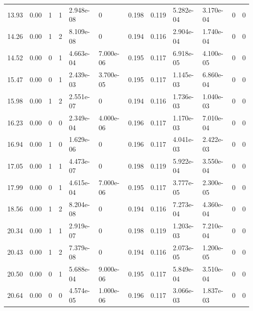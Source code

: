 \documentclass[preview]{standalone}
\begin{document}
{{\begin{tabular}{L{1.2cm}C{1.2cm} C{0.3cm}C{0.5cm} C{1.4cm}C{1.4cm} C{1.4cm}C{1.4cm} C{1.6cm}C{1.6cm} C{1.6cm}C{1.6cm}}
  13.93  &  0.00  & 1     &  1 &  2.948e-08  & 0  &  0.198&   0.119& 5.282e-04 & 3.170e-04   &  0 & 0  \\ 
  14.26  &  0.00  & 1     &  2 &  8.109e-08  & 0  &  0.194&   0.116& 2.904e-04 & 1.740e-04   &  0 & 0  \\ 
  14.52  &  0.00  & 0     &  1 &  4.663e-04  & 7.000e-06  &  0.195&   0.117& 6.918e-05 & 4.100e-05   &  0 & 0  \\ 
  15.47  &  0.00  & 0     &  1 &  2.439e-03  & 3.700e-05  &  0.195&   0.117& 1.145e-03 & 6.860e-04   &  0 & 0  \\ 
  15.98  &  0.00  & 1     &  2 &  2.551e-07  & 0  &  0.194&   0.116& 1.736e-03 & 1.040e-03   &  0 & 0  \\ 
  16.23  &  0.00  & 0     &  0 &  2.349e-04  & 4.000e-06  &  0.196&   0.117& 1.170e-03 & 7.010e-04   &  0 & 0  \\ 
  16.94  &  0.00  & 1     &  0 &  1.629e-06  & 0  &  0.196&   0.117& 4.041e-03 & 2.422e-03   &  0 & 0  \\ 
  17.05  &  0.00  & 1     &  1 &  4.473e-07  & 0  &  0.198&   0.119& 5.922e-04 & 3.550e-04   &  0 & 0  \\ 
  17.99  &  0.00  & 0     &  1 &  4.615e-04  & 7.000e-06  &  0.195&   0.117& 3.777e-05 & 2.300e-05   &  0 & 0  \\ 
  18.56  &  0.00  & 1     &  2 &  8.204e-08  & 0  &  0.194&   0.116& 7.273e-04 & 4.360e-04   &  0 & 0  \\ 
  20.34  &  0.00  & 1     &  1 &  2.919e-07  & 0  &  0.198&   0.119& 1.203e-03 & 7.210e-04   &  0 & 0  \\ 
  20.43  &  0.00  & 1     &  2 &  7.379e-08  & 0  &  0.194&   0.116& 2.073e-05 & 1.200e-05   &  0 & 0  \\ 
  20.50  &  0.00  & 0     &  1 &  5.688e-04  & 9.000e-06  &  0.195&   0.117& 5.849e-04 & 3.510e-04   &  0 & 0  \\ 
  20.64  &  0.00  & 0     &  0 &  4.574e-05  & 1.000e-06  &  0.196&   0.117& 3.066e-03 & 1.837e-03   &  0 & 0  \\ 
\hline 
\end{tabular} 

}}
\end{document}
